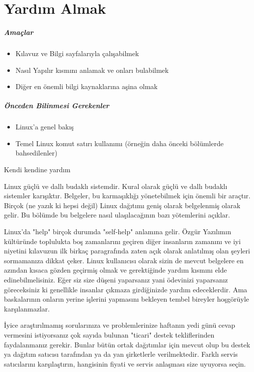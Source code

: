 \chapter{Yardım Almak}
\paragraph{Amaçlar}
\begin{itemize}
 \item Kılavuz ve Bilgi sayfalarıyla çalışabilmek
 \item Nasıl Yapılır kısmını anlamak ve onları bulabilmek
 \item Diğer en önemli bilgi kaynaklarına aşina olmak
 \end{itemize}
\paragraph{Önceden Bilinmesi Gerekenler}
\begin{itemize}
 \item Linux'a genel bakış
 \item Temel Linux komut satırı kullanımı (örneğin daha önceki bölümlerde bahsedilenler)
\end{itemize}
\begin{section}{Kendi kendine yardım}

Linux güçlü ve dallı budaklı sistemdir. Kural olarak güçlü ve dallı budaklı sistemler karışıktır. Belgeler, bu karmaşıklığı yönetebilmek için önemli bir araçtır. Birçok (ne yazık ki hepsi değil) Linux dağıtımı geniş olarak belgelenmiş olarak gelir. Bu bölümde bu belgelere nasıl ulaşılacağının bazı yötemlerini açıklar.

Linux'da "help" birçok durumda "self-help" anlamına gelir. Özgür Yazılımın kültüründe toplulukta boş zamanlarını geçiren diğer insanların  
zamanını ve iyi niyetini kılavuzun ilk birkaç paragrafında zaten açık olarak anlatılmış olan şeyleri sormamanıza dikkat çeker. Linux kullanıcısı
olarak sizin de mevcut belgelere en azından kısaca gözden geçirmiş olmak ve gerektiğinde yardım kısmını elde edinebilmelisiniz. Eğer siz size düşeni
yaparsanız yani ödevinizi yaparsanız göreceksiniz ki genellikle insanlar çıkmaza girdiğinizde yardım edeceklerdir. Ama baskalarının onların yerine
işlerini yapmasını bekleyen tembel bireyler hoşgörüyle karşılanmazlar.

İyice araştırılmamış sorularınıza ve problemlerinize haftanın yedi günü cevap vermesini istiyorsanız çok sayıda bulunan "ticari" destek tekliflerinden faydalanmanız gerekir. Bunlar bütün ortak dağıtımlar için mevcut olup bu destek ya dağıtım satıcısı tarafından ya da yan şirketlerle verilmektedir. Farklı servis satıcılarını karşılaştırın, hangisinin fiyati ve servis anlaşması size uyuyorsa seçin.
\end{section}
